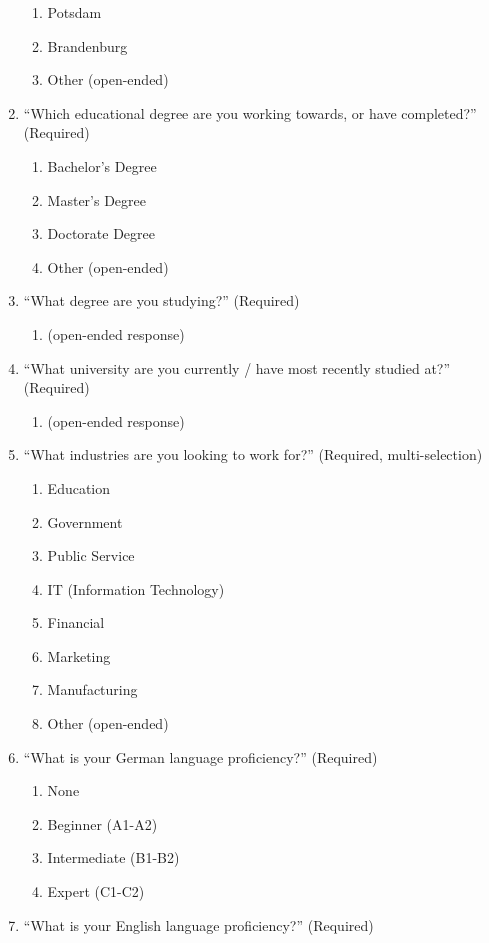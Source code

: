 \begin{enumerate}
\begin{enumerate}
		\item	Potsdam
		\item	Brandenburg
		\item	Other (open-ended)
	\end{enumerate}
	\item “Which educational degree are you working towards, or have completed?”  (Required)
	\begin{enumerate}
		\item Bachelor's Degree
		\item Master's Degree
		\item Doctorate Degree
		\item Other (open-ended)
	\end{enumerate}
	\item “What degree are you studying?” (Required)
	\begin{enumerate}
		\item (open-ended response)
	\end{enumerate}
	\item “What university are you currently / have most recently studied at?” (Required)
	\begin{enumerate}
		\item (open-ended response)
	\end{enumerate}
	\item “What industries are you looking to work for?” (Required, multi-selection)
	\begin{enumerate}
		\item Education
		\item Government
		\item Public Service
		\item IT (Information Technology)
		\item Financial
		\item Marketing
		\item Manufacturing
		\item Other (open-ended)
	\end{enumerate}
	\item “What is your German language proficiency?” (Required)
	\begin{enumerate}
		\item None
		\item Beginner (A1-A2)
		\item Intermediate (B1-B2)
		\item Expert (C1-C2)
	\end{enumerate}
	\item “What is your English language proficiency?” (Required)

\end{enumerate}
